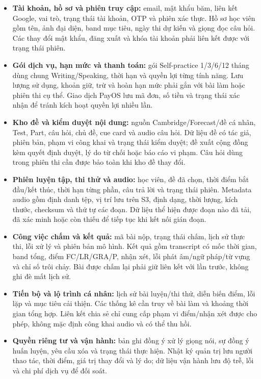 \begin{itemize}
\item \textbf{Tài khoản, hồ sơ và phiên truy cập:} email, mật khẩu băm, liên kết Google, vai trò, trạng thái tài khoản, OTP và phiên xác thực. Hồ sơ học viên gồm tên, ảnh đại diện, band mục tiêu, ngày thi dự kiến và giọng đọc câu hỏi. Các thay đổi mật khẩu, đăng xuất và khóa tài khoản phải liên kết được với trạng thái phiên.

\item \textbf{Gói dịch vụ, hạn mức và thanh toán:} gói Self-practice 1/3/6/12 tháng dùng chung Writing/Speaking, thời hạn và quyền lợi từng tính năng. Lưu lượng sử dụng, khoản giữ, trừ và hoàn hạn mức phải gắn với bài làm hoặc phiên thi cụ thể. Giao dịch PayOS lưu mã đơn, số tiền và trạng thái xác nhận để tránh kích hoạt quyền lợi nhiều lần.

\item \textbf{Kho đề và kiểm duyệt nội dung:} nguồn Cambridge/Forecast/đề cá nhân, Test, Part, câu hỏi, chủ đề, cue card và audio câu hỏi. Dữ liệu đề có tác giả, phiên bản, phạm vi công khai và trạng thái kiểm duyệt; đề xuất cộng đồng kèm quyết định duyệt, lý do từ chối hoặc báo cáo vi phạm. Câu hỏi dùng trong phiên thi cần được bảo toàn khi kho đề thay đổi.

\item \textbf{Phiên luyện tập, thi thử và audio:} học viên, đề đã chọn, thời điểm bắt đầu/kết thúc, thời hạn từng phần, câu trả lời và trạng thái phiên. Metadata audio gồm định danh tệp, vị trí lưu trên S3, định dạng, thời lượng, kích thước, checksum và thứ tự các đoạn. Dữ liệu thể hiện được đoạn nào đã tải, đã xác minh hoặc còn thiếu để tiếp tục khi kết nối gián đoạn.

\item \textbf{Công việc chấm và kết quả:} mã bài nộp, trạng thái chấm, lịch sử thực thi, lỗi xử lý và phiên bản mô hình. Kết quả gồm transcript có mốc thời gian, band tổng, điểm FC/LR/GRA/P, nhận xét, lỗi phát âm/ngữ pháp/từ vựng và chỉ số trôi chảy. Bài được chấm lại phải giữ liên kết với lần trước, không ghi đè mất lịch sử.

\item \textbf{Tiến bộ và lộ trình cá nhân:} lịch sử bài luyện/thi thử, diễn biến điểm, lỗi lặp và mục tiêu cải thiện. Các thống kê cần truy về bài làm và khoảng thời gian tổng hợp. Liên kết chia sẻ chỉ cung cấp phạm vi điểm/nhận xét được cho phép, không mặc định công khai audio và có thể thu hồi.

\item \textbf{Quyền riêng tư và vận hành:} bản ghi đồng ý xử lý giọng nói, sự đồng ý huấn luyện, yêu cầu xóa và trạng thái thực hiện. Nhật ký quản trị lưu người thao tác, thời điểm, giá trị thay đổi và lý do; dữ liệu vận hành lưu độ trễ, lỗi và chi phí dịch vụ để đối soát.
\end{itemize}

